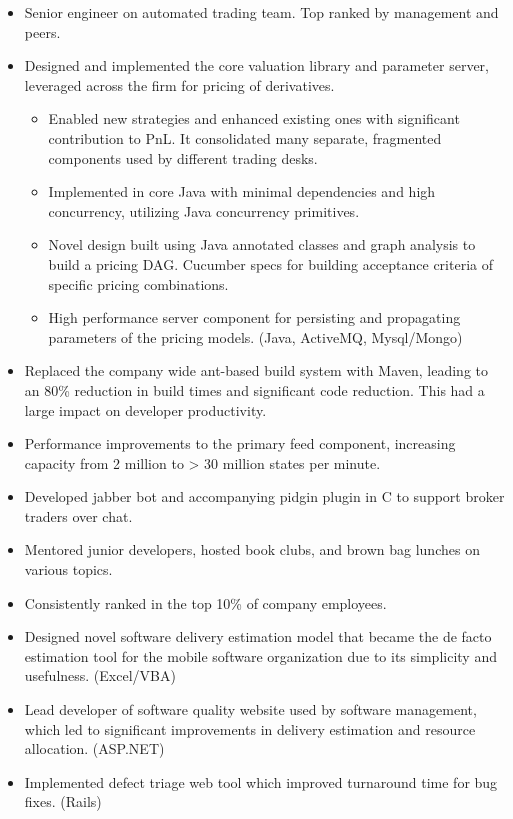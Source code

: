 \documentclass[11pt,a4paper,roman]{moderncv}
\begin{document}
\vspace{5mm}

\begin{itemize}
\item Senior engineer on automated trading team. Top ranked by management and peers.
\item Designed and implemented the core valuation library and parameter server, leveraged across the firm for pricing of derivatives.
  \begin{itemize}
    \item Enabled new strategies and enhanced existing ones with significant contribution to PnL. It
          consolidated many separate, fragmented components used by different trading desks.
    \item Implemented in core Java with minimal dependencies and high concurrency, utilizing Java
          concurrency primitives.
    \item Novel design built using Java annotated classes and graph analysis to build a pricing DAG.\@
          Cucumber specs for building acceptance criteria of specific pricing combinations.
    \item High performance server component for persisting and propagating parameters of the pricing models.
          (Java, ActiveMQ, Mysql/Mongo)
  \end{itemize}
  \item Replaced the company wide ant-based build system with Maven, leading to an 80\%
        reduction in build times and significant code reduction. This had a large impact on developer
        productivity.
  \item Performance improvements to the primary feed component, increasing capacity from 2 million to \textgreater{} 30
        million states per minute.
\item Developed jabber bot and accompanying pidgin plugin in C to support broker traders over chat.
\item Mentored junior developers, hosted book clubs, and brown bag lunches on various topics.
\end{itemize}

\vspace{5mm}

\begin{itemize}
\item Consistently ranked in the top 10\% of company employees.
  \item Designed novel software delivery estimation model that became the de facto estimation tool for the mobile
        software organization due to its simplicity and usefulness. (Excel/VBA)
  \item Lead developer of software quality website used by software management, which led to significant improvements
        in delivery estimation and resource allocation. (ASP.NET)
  \item Implemented defect triage web tool which improved turnaround time for bug fixes. (Rails)
\end{itemize}
\end{document}
